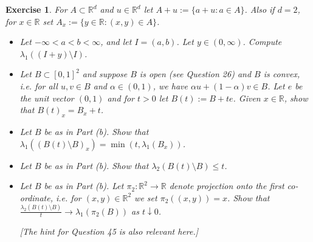 \documentclass{article}
\newtheorem{exercise}[theorem]{Exercise}
\begin{document}
\begin{exercise}
For $A \subset \mathbb{R}^d$ and $u \in \mathbb{R}^d$ let $A + u := \{a + u : a \in A\}$. Also if $d = 2$, for $x \in \mathbb{R}$ set $A_x := \{y \in \mathbb{R} : (x, y) \in A\}$.
\begin{itemize}
    \item[(a)] Let $-\infty < a < b < \infty$, and let $I = (a,b)$. Let $y \in (0,\infty)$. Compute $\lambda_1((I + y) \setminus I)$.
    \item[(b)] Let $B \subset [0,1]^2$ and suppose $B$ is open (see Question 26) and $B$ is convex, i.e. for all $u,v \in B$ and $\alpha \in (0,1)$, we have $\alpha u + (1-\alpha)v \in B$. Let $e$ be the unit vector $(0,1)$ and for $t > 0$ let $B(t) := B + te$. Given $x \in \mathbb{R}$, show that $B(t)_x = B_x + t$.
    \item[(c)] Let $B$ be as in Part (b). Show that $\lambda_1((B(t) \setminus B)_x) = \min(t, \lambda_1(B_x))$.
    \item[(d)] Let $B$ be as in Part (b). Show that $\lambda_2(B(t) \setminus B) \leq t$.
    \item[(e)] Let $B$ be as in Part (b). Let $\pi_2 : \mathbb{R}^2 \to \mathbb{R}$ denote projection onto the first co-ordinate, i.e. for $(x,y) \in \mathbb{R}^2$ we set $\pi_2((x,y)) = x$. Show that $\frac{\lambda_2(B(t) \setminus B)}{t} \to \lambda_1(\pi_2(B))$ as $t \downarrow 0$.
    
    \textit{[The hint for Question 45 is also relevant here.]}
\end{itemize}
\end{exercise}
\end{document}
